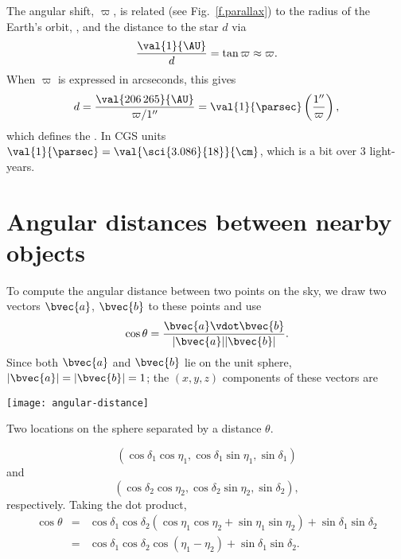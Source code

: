 The angular shift, $\varpi$, is related (see Fig.~\ref{f.parallax}) to the radius of the Earth's orbit, , and the distance to the star $d$ via
\[
\frac{\val{1}{\AU}}{d} = \tan\varpi \approx \varpi.
\]
When $\varpi$ is expressed in arcseconds, this gives
\begin{equation}\label{e.parallax}
d = \frac{\val{206\,265}{\AU}}{\varpi/1''} = \val{1}{\parsec}\left(\frac{1''}{\varpi}\right) ,
\end{equation}
which defines the .  In CGS units $\val{1}{\parsec} = \val{\sci{3.086}{18}}{\cm}$, which is a bit over 3 light-years.

\section{Angular distances between nearby objects}

To compute the angular distance between two points on the sky, we draw two vectors $\bvec{a}$, $\bvec{b}$ to these points and use
\[ \cos\theta = \frac{\bvec{a}\vdot\bvec{b}}{|\bvec{a}||\bvec{b}|}. \]
Since both $\bvec{a}$ and $\bvec{b}$ lie on the unit sphere, $|\bvec{a}| = |\bvec{b}| = 1$; the $(x,y,z)$ components of these vectors are
\begin{marginfigure}[-14\baselineskip]
\texttt{[image: angular-distance]}
\caption[Angular distance between two points on a sphere]{Two locations on the sphere separated by a distance $\theta$.}
\label{f.angular-distance}
\end{marginfigure}
\[
\left(\cos\delta_{1}\cos\eta_{1}, \cos\delta_{1}\sin\eta_{1}, \sin\delta_{1}\right)
\]
and
\[
\left(\cos\delta_{2}\cos\eta_{2}, \cos\delta_{2}\sin\eta_{2}, \sin\delta_{2}\right),
\]
respectively. 
Taking the dot product,
\begin{eqnarray}
\cos\theta &=& \cos\delta_{1}\cos\delta_{2}\left(\cos\eta_{1}\cos\eta_{2} + 
	\sin\eta_{1}\sin\eta_{2}\right) + \sin\delta_{1}\sin\delta_{2}\nonumber\\
	 &=& \cos\delta_{1}\cos\delta_{2}\cos\left(\eta_{1}-\eta_{2}\right) + 
	 	\sin\delta_{1}\sin\delta_{2}.
\label{e.angular-distance}
\end{eqnarray}

